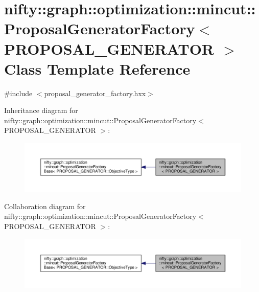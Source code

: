 \hypertarget{classnifty_1_1graph_1_1optimization_1_1mincut_1_1ProposalGeneratorFactory}{}\section{nifty\+:\+:graph\+:\+:optimization\+:\+:mincut\+:\+:Proposal\+Generator\+Factory$<$ P\+R\+O\+P\+O\+S\+A\+L\+\_\+\+G\+E\+N\+E\+R\+A\+T\+O\+R $>$ Class Template Reference}
\label{classnifty_1_1graph_1_1optimization_1_1mincut_1_1ProposalGeneratorFactory}


{\ttfamily \#include $<$proposal\+\_\+generator\+\_\+factory.\+hxx$>$}



Inheritance diagram for nifty\+:\+:graph\+:\+:optimization\+:\+:mincut\+:\+:Proposal\+Generator\+Factory$<$ P\+R\+O\+P\+O\+S\+A\+L\+\_\+\+G\+E\+N\+E\+R\+A\+T\+O\+R $>$\+:\nopagebreak
\begin{figure}[H]
\begin{center}
\leavevmode
\includegraphics[width=350pt]{classnifty_1_1graph_1_1optimization_1_1mincut_1_1ProposalGeneratorFactory__inherit__graph}
\end{center}
\end{figure}


Collaboration diagram for nifty\+:\+:graph\+:\+:optimization\+:\+:mincut\+:\+:Proposal\+Generator\+Factory$<$ P\+R\+O\+P\+O\+S\+A\+L\+\_\+\+G\+E\+N\+E\+R\+A\+T\+O\+R $>$\+:\nopagebreak
\begin{figure}[H]
\begin{center}
\leavevmode
\includegraphics[width=350pt]{classnifty_1_1graph_1_1optimization_1_1mincut_1_1ProposalGeneratorFactory__coll__graph}
\end{center}
\end{figure}
